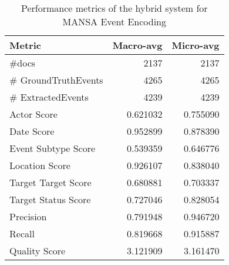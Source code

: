 \begin{table}[]
    \centering
    \begin{tabular}{lrr}
\toprule
              Metric &    Macro-avg &    Micro-avg \\
\midrule
               \#docs &  2137 &  2137 \\
 \# GroundTruthEvents &  4265 &  4265 \\
   \# ExtractedEvents &  4239 &  4239 \\
         Actor Score &     0.621032 &     0.755090 \\
          Date Score &     0.952899 &     0.878390 \\
 Event Subtype Score &     0.539359 &     0.646776 \\
      Location Score &     0.926107 &     0.838040 \\
 Target Target Score &     0.680881 &     0.703337 \\
 Target Status Score &     0.727046 &     0.828054 \\
           Precision &     0.791948 &     0.946720 \\
              Recall &     0.819668 &     0.915887 \\
       Quality Score &     3.121909 &     3.161470 \\
\bottomrule
\end{tabular}
    \caption{Performance metrics of the hybrid system for MANSA Event Encoding}
    \label{tab:hybridPerf}
\end{table}